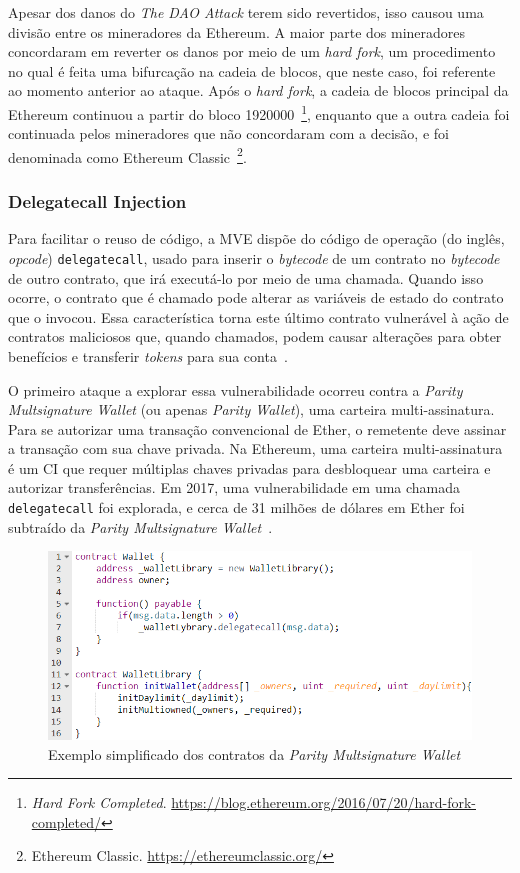Apesar dos danos do \textit{The DAO Attack} terem sido revertidos, isso causou uma divisão entre os mineradores da Ethereum. A maior parte dos mineradores concordaram em reverter os danos por meio de um \textit{hard fork}, um procedimento no qual é feita uma bifurcação na cadeia de blocos, que neste caso, foi referente ao momento anterior ao ataque. Após o \textit{hard fork}, a cadeia de blocos principal da Ethereum continuou a partir do bloco 1920000~\footnote{\textit{Hard Fork Completed}. \url{https://blog.ethereum.org/2016/07/20/hard-fork-completed/}}, enquanto que a outra cadeia foi continuada pelos mineradores que não concordaram com a decisão, e foi denominada como Ethereum Classic~\footnote{Ethereum Classic. \url{https://ethereumclassic.org/}}.  

\subsubsection*{\textbf{Delegatecall Injection}}

Para facilitar o reuso de código, a MVE dispõe do código de operação (do inglês, \textit{opcode}) \texttt{delegatecall}, usado para inserir o \textit{bytecode} de um contrato no \textit{bytecode} de outro contrato, que irá executá-lo por meio de uma chamada. Quando isso ocorre, o contrato que é chamado pode alterar as variáveis de estado do contrato que o invocou. Essa característica torna este último contrato vulnerável à ação de contratos maliciosos que, quando chamados, podem causar alterações para obter benefícios e transferir \textit{tokens} para sua conta~\cite{chen2020survey-ethereum-acm}.

O primeiro ataque a explorar essa vulnerabilidade ocorreu contra a \textit{Parity Multsignature Wallet} (ou apenas \textit{Parity Wallet}), uma carteira multi-assinatura. Para se autorizar uma transação convencional de Ether, o remetente deve assinar a transação com sua chave privada. Na Ethereum, uma carteira multi-assinatura é um CI que requer múltiplas chaves privadas para desbloquear uma carteira e autorizar transferências. Em 2017, uma vulnerabilidade em uma chamada \texttt{delegatecall} foi explorada, e cerca de 31 milhões de dólares em Ether foi subtraído da \textit{Parity Multsignature Wallet}~\cite{chen2020survey-ethereum-acm}.

\begin{figure}[!htb]
 \caption{Exemplo simplificado dos contratos da \textit{Parity Multsignature Wallet}}
 \label{fig:parity-wallet}
 \centering
 \includegraphics[scale=0.65]{figuras/parity-wallet.png}
\end{figure}

